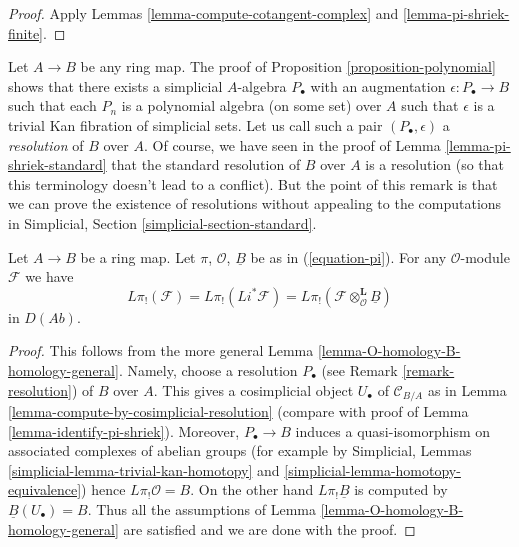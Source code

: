\begin{proof}
Apply Lemmas \ref{lemma-compute-cotangent-complex} and
\ref{lemma-pi-shriek-finite}.
\end{proof}

\begin{remark}
\label{remark-resolution}
Let $A \to B$ be any ring map. The proof of
Proposition \ref{proposition-polynomial}
shows that there exists a simplicial $A$-algebra $P_\bullet$
with an augmentation $\epsilon : P_\bullet \to B$ such that each $P_n$
is a polynomial algebra (on some set) over $A$ such that $\epsilon$
is a trivial Kan fibration of simplicial sets.
Let us call such a pair $(P_\bullet, \epsilon)$ a
{\it resolution} of $B$ over $A$. Of course, we have seen in
the proof of Lemma \ref{lemma-pi-shriek-standard}
that the standard resolution of $B$ over $A$ is a resolution
(so that this terminology doesn't lead to a conflict).
But the point of this remark is that we can prove the existence
of resolutions without appealing to the computations in
Simplicial, Section \ref{simplicial-section-standard}.
\end{remark}

\begin{lemma}
\label{lemma-O-homology-B-homology}
Let $A \to B$ be a ring map. Let $\pi$, $\mathcal{O}$, $\underline{B}$
be as in (\ref{equation-pi}). For any $\mathcal{O}$-module $\mathcal{F}$
we have
$$
L\pi_!(\mathcal{F}) = L\pi_!(Li^*\mathcal{F}) =
L\pi_!(\mathcal{F} \otimes_\mathcal{O}^\mathbf{L} \underline{B})
$$
in $D(\textit{Ab})$.
\end{lemma}

\begin{proof}
This follows from the more general
Lemma \ref{lemma-O-homology-B-homology-general}.
Namely, choose a resolution $P_\bullet$ (see
Remark \ref{remark-resolution}) of $B$ over $A$.
This gives a cosimplicial object $U_\bullet$ of $\mathcal{C}_{B/A}$
as in Lemma \ref{lemma-compute-by-cosimplicial-resolution}
(compare with proof of Lemma \ref{lemma-identify-pi-shriek}).
Moreover, $P_\bullet \to B$ induces a quasi-isomorphism on associated
complexes of abelian groups (for example by
Simplicial, Lemmas \ref{simplicial-lemma-trivial-kan-homotopy} and
\ref{simplicial-lemma-homotopy-equivalence})
hence $L\pi_!\mathcal{O} = B$. On the other hand $L\pi_!\underline{B}$
is computed by $\underline{B}(U_\bullet) = B$.
Thus all the assumptions of Lemma \ref{lemma-O-homology-B-homology-general}
are satisfied and we are done with the proof.
\end{proof}

